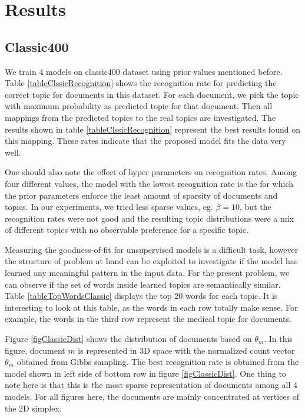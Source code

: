 \documentclass[twoside,12pt]{article}
\begin{document}
\section{Results}


\subsection{Classic400}
We train 4 models on classic400 dataset using prior values mentioned before. Table \ref{tableClssicRecognition} shows the recognition rate for predicting the correct topic for documents in this dataset. For each document, we pick the topic with maximum probability as predicted topic for that document. Then all mappings from the predicted topics to the real topics are investigated. The results shown in table \ref{tableClssicRecognition} represent the best results found on this mapping. These rates indicate that the proposed model fits the data very well.

One should also note the effect of hyper parameters on recognition rates. Among four different values, the model with the lowest recognition rate is the for which the prior parameters enforce the least amount of sparsity of documents and topics. In our experiments, we tried less sparse values, eg. $\beta=10$, but the recognition rates were not good and the resulting topic distributions were a mix of different topics with no observable preference for a specific topic.

Measuring the goodness-of-fit for unsupervised models is a difficult task, however the structure of problem at hand can be exploited to investigate if the model has learned any meaningful pattern in the input data. For the present problem, we can observe if the set of words inside learned topics are semantically similar. Table \ref{tableTopWordsClassic} displays the top 20 words for each topic. It is interesting to look at this table, as the words in each row totally make sense. For example, the words in the third row represent the medical topic for documents.

Figure \ref{figClassicDist} shows the distribution of documents based on $\theta_m$. In this figure, document $m$ is represented in 3D space with the normalized count vector $\theta_m$ obtained from Gibbs sampling. The best recognition rate is obtained from the model shown in left side of bottom row in figure \ref{figClassicDist}. One thing to note here is that this is the most sparse representation of documents among all 4 models. For all figures here, the documents are mainly concentrated at vertices of the 2D simplex. 
\end{document}
